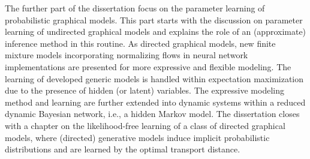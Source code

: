 The further part of the dissertation focus on the parameter learning of probabilistic graphical models. This part starts with the discussion on parameter learning of undirected graphical models and explains the role of an (approximate) inference method in this routine. As directed graphical models, new finite mixture models incorporating normalizing flows in neural network implementations are presented for more expressive and flexible modeling. The learning of developed generic models is handled within expectation maximization due to the presence of hidden (or latent) variables. The expressive modeling method and learning are further extended into dynamic systems within a reduced dynamic Bayesian network, i.e., a hidden Markov model. The dissertation closes with a chapter on the likelihood-free learning of a class of directed graphical models, where (directed) generative models induce implicit probabilistic distributions and are learned by the optimal transport distance.


